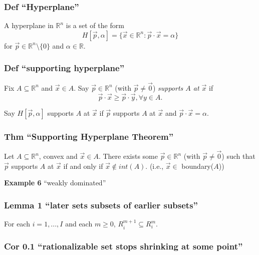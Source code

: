 \documentclass[
]{article}
\begin{document}
\hypertarget{def-hyperplane}{%
\subsubsection{Def ``Hyperplane''}\label{def-hyperplane}}

A hyperplane in \(\mathbb{R}^n\) is a set of the form
\[H[\vec{p}, \alpha] = \{\vec{x} \in \mathbb{R}^n: \vec{p} \cdot \vec{x}= \alpha\}\]
for \(\vec{p} \in \mathbb{R}^n \setminus \{0\}\) and
\(\alpha \in \mathbb{R}\).

\hypertarget{def-supporting-hyperplane}{%
\subsubsection{Def ``supporting
hyperplane''}\label{def-supporting-hyperplane}}

Fix \(A \subseteq \mathbb{R}^n\) and \(\vec{x} \in A\). Say
\(\vec{p} \in \mathbb{R}^n\) (with \(\vec{p}\neq \vec{0}\))
\emph{supports \(A\) at \(\vec{x}\)} if
\[\vec{p} \cdot \vec{x} \geq \vec{p} \cdot \vec{y}, \forall y \in A.\]

Say \(H[\vec{p}, \alpha]\) supports \(A\) at \(\vec{x}\) if \(\vec{p}\)
supports \(A\) at \(\vec{x}\) and \(\vec{p} \cdot \vec{x} = \alpha\).

\hypertarget{thm-supporting-hyperplane-theorem}{%
\subsubsection{Thm ``Supporting Hyperplane
Theorem''}\label{thm-supporting-hyperplane-theorem}}

Let \(A \subseteq \mathbb{R}^n\), convex and \(\vec{x} \in A\). There
exists some \(\vec{p} \in \mathbb{R}^n\) (with \(\vec{p}\neq \vec{0}\))
such that \(\vec{p}\) supports \(A\) at \(\vec{x}\) if and only if
\(\vec{x} \notin int(A)\). (i.e., \(\vec{x} \in\) boundary(\(A\)))

\textbf{Example 6} ``weakly dominated''

\hypertarget{lemma-1-later-sets-subsets-of-earlier-subsets}{%
\subsubsection{Lemma 1 ``later sets subsets of earlier
subsets''}\label{lemma-1-later-sets-subsets-of-earlier-subsets}}

For each \(i = 1, ..., I\) and each \(m\geq 0\),
\(R_i^{m+1} \subseteq R_i^m\).

\hypertarget{cor-0.1-rationalizable-set-stops-shrinking-at-some-point}{%
\subsubsection{Cor 0.1 ``rationalizable set stops shrinking at some
point''}\label{cor-0.1-rationalizable-set-stops-shrinking-at-some-point}}
\end{document}
